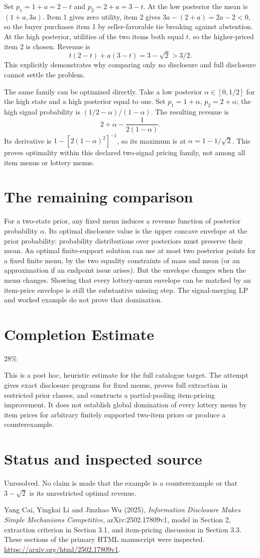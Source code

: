 \documentclass[11pt]{article}
\begin{document}
Set $p_1=1+a=2-t$ and $p_2=2+a=3-t$. At the low posterior the mean is $(1+a,3a)$. Item 1 gives zero utility, item 2 gives $3a-(2+a)=2a-2<0$, so the buyer purchases item 1 by seller-favorable tie breaking against abstention. At the high posterior, utilities of the two items both equal $t$, so the higher-priced item 2 is chosen. Revenue is
\[
 t(2-t)+a(3-t)=3-\sqrt2>3/2.
\]
This explicitly demonstrates why comparing only no disclosure and full disclosure cannot settle the problem.

The same family can be optimized directly. Take a low posterior $\alpha\in[0,1/2]$ for the high state and a high posterior equal to one. Set $p_1=1+\alpha$, $p_2=2+\alpha$; the high signal probability is $(1/2-\alpha)/(1-\alpha)$. The resulting revenue is
\[
 2+\alpha-\frac{1}{2(1-\alpha)}.
\]
Its derivative is $1-[2(1-\alpha)^2]^{-1}$, so its maximum is at $\alpha=1-1/\sqrt2$. This proves optimality within this declared two-signal pricing family, not among all item menus or lottery menus.

\section*{The remaining comparison}
For a two-state prior, any fixed menu induces a revenue function of posterior probability $\alpha$. Its optimal disclosure value is the upper concave envelope at the prior probability: probability distributions over posteriors must preserve their mean. An optimal finite-support solution can use at most two posterior points for a fixed finite menu, by the two equality constraints of mass and mean (or an approximation if an endpoint issue arises). But the envelope changes when the menu changes. Showing that every lottery-menu envelope can be matched by an item-price envelope is still the substantive missing step. The signal-merging LP and worked example do not prove that domination.

\section{Completion Estimate}
28\%

This is a post hoc, heuristic estimate for the full catalogue target.
The attempt gives exact disclosure programs for fixed menus, proves full extraction in restricted prior classes, and constructs a partial-pooling item-pricing improvement. It does not establish global domination of every lottery menu by item prices for arbitrary finitely supported two-item priors or produce a counterexample.

\section*{Status and inspected source}
Unresolved. No claim is made that the example is a counterexample or that $3-\sqrt2$ is its unrestricted optimal revenue.

Yang Cai, Yingkai Li and Jinzhao Wu (2025), \emph{Information Disclosure Makes Simple Mechanisms Competitive}, arXiv:2502.17809v1, model in Section 2, extraction criterion in Section 3.1, and item-pricing discussion in Section 3.3. These sections of the primary HTML manuscript were inspected. \url{https://arxiv.org/html/2502.17809v1}.
\end{document}
